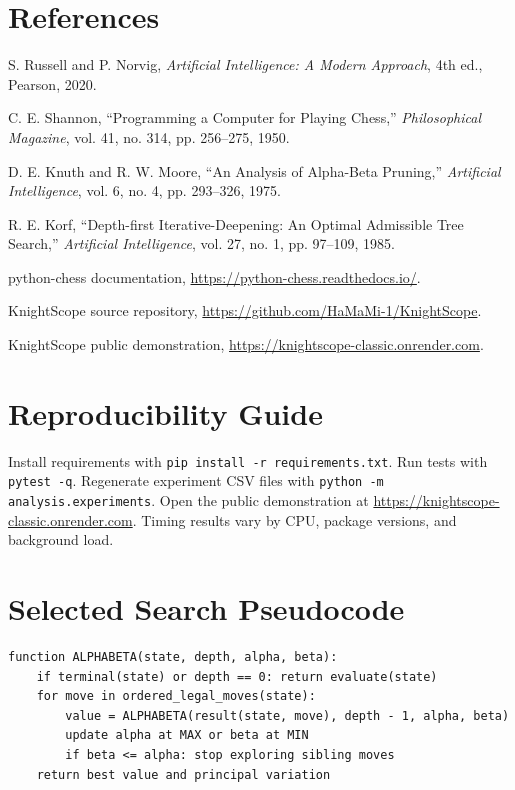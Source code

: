 \documentclass[12pt,a4paper]{report}
\begin{document}
\chapter*{References}
\begin{enumerate}[label={[\arabic*]}]
\item S. Russell and P. Norvig, \textit{Artificial Intelligence: A Modern Approach}, 4th ed., Pearson, 2020.
\item C. E. Shannon, ``Programming a Computer for Playing Chess,'' \textit{Philosophical Magazine}, vol. 41, no. 314, pp. 256--275, 1950.
\item D. E. Knuth and R. W. Moore, ``An Analysis of Alpha-Beta Pruning,'' \textit{Artificial Intelligence}, vol. 6, no. 4, pp. 293--326, 1975.
\item R. E. Korf, ``Depth-first Iterative-Deepening: An Optimal Admissible Tree Search,'' \textit{Artificial Intelligence}, vol. 27, no. 1, pp. 97--109, 1985.
\item python-chess documentation, \url{https://python-chess.readthedocs.io/}.
\item KnightScope source repository, \url{https://github.com/HaMaMi-1/KnightScope}.
\item KnightScope public demonstration, \url{https://knightscope-classic.onrender.com}.
\end{enumerate}
\appendix
\chapter{Reproducibility Guide}
Install requirements with \texttt{pip install -r requirements.txt}. Run tests with \texttt{pytest -q}. Regenerate experiment CSV files with \texttt{python -m analysis.experiments}. Open the public demonstration at \url{https://knightscope-classic.onrender.com}. Timing results vary by CPU, package versions, and background load.
\chapter{Selected Search Pseudocode}
\begin{lstlisting}
function ALPHABETA(state, depth, alpha, beta):
    if terminal(state) or depth == 0: return evaluate(state)
    for move in ordered_legal_moves(state):
        value = ALPHABETA(result(state, move), depth - 1, alpha, beta)
        update alpha at MAX or beta at MIN
        if beta <= alpha: stop exploring sibling moves
    return best value and principal variation
\end{lstlisting}
\end{document}
